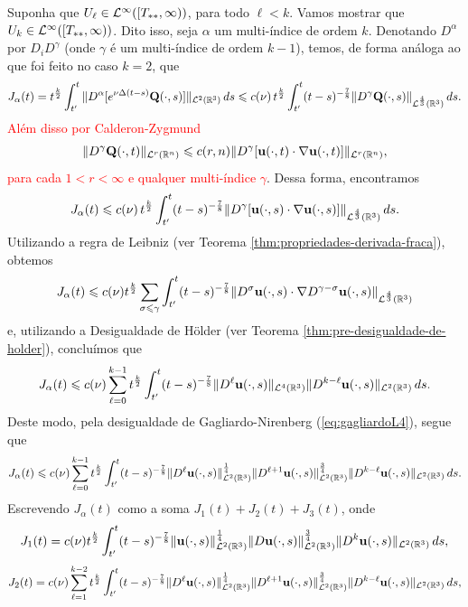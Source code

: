\begin{prf}
    Suponha que $U_{\ell} \in \mathcal{L}^\infty([T_{**},\infty))$, para todo $\ell < k$. Vamos mostrar que $U_k \in \mathcal{L}^\infty([T_{**},\infty))$. Dito isso, seja $\alpha$ um multi-índice de ordem $k$.
    Denotando $D^\alpha$ por $D_i D^{\gamma}$ (onde $\gamma$ é um multi-índice de ordem $k-1$), temos, de forma análoga ao que foi feito no caso $k = 2$, que
    \[
        J_\alpha(t) = t^{\frac{k}{2}} \int_{t'}^t \Vert D^\alpha [ e^{\nu \Delta (t - s)}\mathbf{Q}(\cdot,s)] \Vert_{\mathcal{L}^2(\mathbb{R}^3)} \,ds \leqslant c(\nu) \, t^{\frac{k}{2}} \int_{t'}^t (t - s)^{-\frac{7}{8}} \Vert D^{\gamma} \mathbf{Q}(\cdot,s) \Vert_{\mathcal{L}^\frac{4}{3}(\mathbb{R}^3)} \,ds.
    \]
    \textcolor{red}{Além disso por Calderon-Zygmund
    \[
        \Vert D^{\gamma}\mathbf{Q}(\cdot,t) \Vert_{\mathcal{L}^r(\mathbb{R}^n)} \leqslant c(r,n) \Vert D^{\gamma} [ \mathbf{u}(\cdot,t) \cdot \nabla \mathbf{u}(\cdot,t) ] \Vert_{\mathcal{L}^r(\mathbb{R}^n)},
    \]
    para cada $1 < r < \infty$ e qualquer multi-índice $\gamma$}. Dessa forma, encontramos
    \[
        J_\alpha(t) \leqslant c(\nu)\, t^{\frac{k}{2}} \int_{t'}^t (t-s)^{-\frac{7}{8}} \Vert D^{\gamma} [\mathbf{u}(\cdot,s) \cdot \nabla \mathbf{u}(\cdot,s)] \Vert_{\mathcal{L}^\frac{4}{3}(\mathbb{R}^3)}\,ds.
    \]
    Utilizando a regra de Leibniz (ver Teorema \ref{thm:propriedades-derivada-fraca}), obtemos
    \[
        J_\alpha(t) \leqslant c(\nu) t^{\frac{k}{2}} \sum_{\sigma \leqslant \gamma} \int_{t'}^t (t - s)^{-\frac{7}{8}} \Vert D^{\sigma} \mathbf{u}(\cdot,s) \cdot \nabla D^{\gamma - \sigma} \mathbf{u}(\cdot,s) \Vert_{\mathcal{L}^{\frac{4}{3}}(\mathbb{R}^3)}
    \]
    e, utilizando a Desigualdade de Hölder (ver Teorema \ref{thm:pre-desigualdade-de-holder}), concluímos que
    \[
        J_\alpha(t) \leqslant c(\nu) \sum_{\ell = 0}^{k-1} t^{\frac{k}{2}} \int_{t'}^t (t- s)^{-\frac{7}{8}} \Vert D^\ell \mathbf{u}(\cdot,s) \Vert_{\mathcal{L}^4(\mathbb{R}^3)} \Vert D^{k-\ell} \mathbf{u}(\cdot,s) \Vert_{\mathcal{L}^2(\mathbb{R}^3)}\,ds.
    \]
    Deste modo, pela desigualdade de Gagliardo-Nirenberg (\ref{eq:gagliardoL4}), segue que
    \[
        J_\alpha(t) \leqslant c(\nu) \sum_{\ell=0}^{k-1} t^{\frac{k}{2}} \int_{t'}^t ( t- s)^{-\frac{7}{8}} \Vert D^\ell \mathbf{u}(\cdot,s) \Vert_{\mathcal{L}^2(\mathbb{R}^3)}^{\frac{1}{4}} \Vert D^{\ell + 1} \mathbf{u}(\cdot,s) \Vert_{\mathcal{L}^2(\mathbb{R}^3)}^{\frac{3}{4}} \Vert D^{k-\ell} \mathbf{u}(\cdot,s) \Vert_{\mathcal{L}^2(\mathbb{R}^3)} \,ds.
    \]
    Escrevendo $J_\alpha(t)$ como a soma $J_1(t) + J_2(t) + J_3(t)$, onde
    \[
        J_1(t) = c(\nu) t^{\frac{k}{2}} \int_{t'}^t ( t- s)^{-\frac{7}{8}} \Vert \mathbf{u}(\cdot,s) \Vert_{\mathcal{L}^2(\mathbb{R}^3)}^{\frac{1}{4}} \Vert D \mathbf{u}(\cdot,s) \Vert_{\mathcal{L}^2(\mathbb{R}^3)}^{\frac{3}{4}} \Vert D^{k} \mathbf{u}(\cdot,s) \Vert_{\mathcal{L}^2(\mathbb{R}^3)} \,ds,
    \]
    \[
        J_2(t) = c(\nu) \sum_{\ell=1}^{k-2} t^{\frac{k}{2}} \int_{t'}^t ( t- s)^{-\frac{7}{8}} \Vert D^\ell \mathbf{u}(\cdot,s) \Vert_{\mathcal{L}^2(\mathbb{R}^3)}^{\frac{1}{4}} \Vert D^{\ell + 1} \mathbf{u}(\cdot,s) \Vert_{\mathcal{L}^2(\mathbb{R}^3)}^{\frac{3}{4}} \Vert D^{k-\ell} \mathbf{u}(\cdot,s) \Vert_{\mathcal{L}^2(\mathbb{R}^3)} \,ds,
\]
\end{prf}
